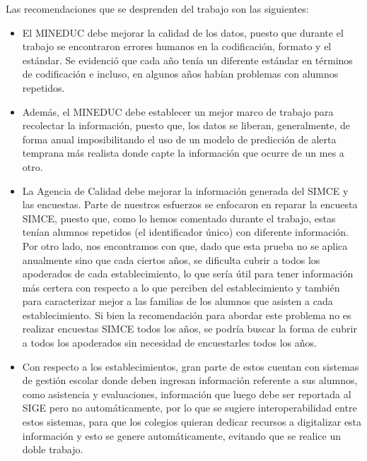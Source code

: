Las recomendaciones que se desprenden del trabajo son las siguientes:
\begin{itemize}
\item El MINEDUC debe mejorar la calidad de los datos, puesto que durante el trabajo se encontraron errores humanos en la codificación, formato y el estándar. Se evidenció que cada año tenía un diferente estándar en términos de codificación e incluso, en algunos años habían problemas con alumnos repetidos.
\item Además, el MINEDUC debe establecer un mejor marco de trabajo para recolectar la información, puesto que, los datos se liberan, generalmente, de forma anual imposibilitando el uso de un modelo de predicción de alerta temprana más realista donde capte la información que ocurre de un mes a otro.
\item La Agencia de Calidad debe mejorar la información generada del SIMCE y las encuestas. Parte de nuestros esfuerzos se enfocaron en reparar la encuesta SIMCE, puesto que, como lo hemos comentado durante el trabajo, estas tenían alumnos repetidos (el identificador único) con diferente información. Por otro lado, nos encontramos con que, dado que esta prueba no se aplica anualmente sino que cada ciertos años, se dificulta cubrir a todos los apoderados de cada establecimiento, lo que sería útil para tener información más certera con respecto a lo que perciben del establecimiento y también para caracterizar mejor a las familias de los alumnos que asisten a cada establecimiento. Si bien la recomendación para abordar este problema no es realizar encuestas SIMCE todos los años, se podría buscar la forma de cubrir a todos los apoderados sin necesidad de encuestarles todos los años. 
\item Con respecto a los establecimientos, gran parte de estos cuentan con sistemas de gestión escolar donde deben ingresan información referente a sus alumnos, como asistencia y evaluaciones, información que luego debe ser reportada al SIGE pero no automáticamente, por lo que se sugiere interoperabilidad entre estos sistemas, para que los colegios quieran dedicar recursos a digitalizar esta información y esto se genere automáticamente, evitando que se realice un doble trabajo.
\end{itemize}


